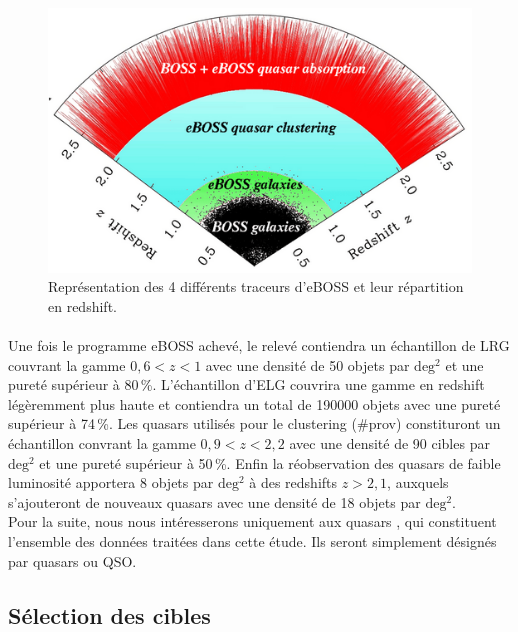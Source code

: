 \documentclass[11pt, twoside, a4paper, openright]{report}
\begin{document}
\begin{figure}
  \centering
  \includegraphics[scale=0.5]{../img/eBOSS/eBOSStracers}
  \caption{Représentation des 4 différents traceurs d'eBOSS et leur r\'epartition en redshift.}
  \label{fig:eBOSStracers}
\end{figure}
\paragraph{}
Une fois le programme eBOSS achevé, le relevé contiendra un échantillon de LRG couvrant la gamme $0,6 < z < 1$ avec une densité de 50 objets par $\mathrm{deg^{2}}$ et une pureté supérieur à 80\,\%. L'échantillon d'ELG couvrira une gamme en redshift légèremment plus haute et contiendra un total de \num{190000} objets avec une pureté supérieur à 74\,\%. Les quasars utilisés pour le clustering (\#prov) constituront un échantillon convrant la gamme $0,9 < z < 2,2$ avec une densité de 90 cibles par $\mathrm{deg^{2}}$ et une pureté supérieur à 50\,\%. Enfin la réobservation des quasars \lya de faible luminosité apportera 8 objets par $\mathrm{deg^{2}}$ à des redshifts $z > 2,1$, auxquels s'ajouteront de nouveaux quasars \lya avec une densité de 18 objets par $\mathrm{deg^{2}}$. \\
Pour la suite, nous nous intéresserons uniquement aux quasars \lya, qui constituent l'ensemble des données traitées dans cette étude. Ils seront simplement désignés par quasars ou QSO.


\subsection{Sélection des cibles}
\end{document}
